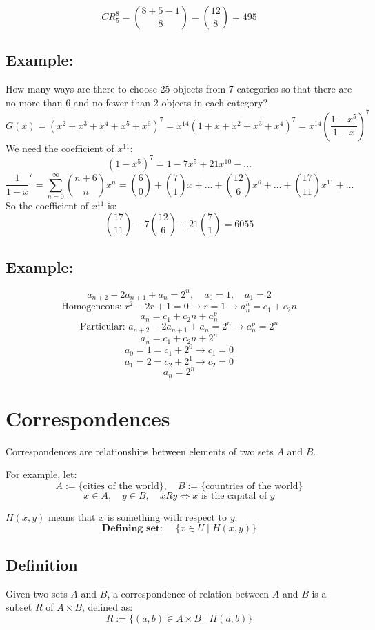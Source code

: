 \documentclass[11pt]{article}
\begin{document}
\[
CR_5^8 = \binom{8 + 5 - 1}{8} = \binom{12}{8} = 495
\]

\subsection*{Example:}
How many ways are there to choose 25 objects from 7 categories so that there are no more than 6 and no fewer than 2 objects in each category?
\[
G(x) = (x^2 + x^3 + x^4 + x^5 + x^6)^7 = x^{14} (1 + x + x^2 + x^3 + x^4)^7 = x^{14} \left( \frac{1 - x^5}{1 - x} \right)^7
\]
We need the coefficient of $x^{11}$:
\[
(1 - x^5)^7 = 1 - 7x^5 + 21x^{10} - \dots
\]
\[
\frac{1}{1 - x}^7 = \sum_{n = 0}^{\infty} \binom{n + 6}{n} x^n = \binom{6}{0} + \binom{7}{1}x + \dots + \binom{12}{6}x^6 + \dots + \binom{17}{11}x^{11} + \dots
\]
So the coefficient of $x^{11}$ is:
\[
\binom{17}{11} - 7 \binom{12}{6} + 21 \binom{7}{1} = 6055
\]

\subsection*{Example:}
\[
a_{n + 2} - 2a_{n + 1} + a_n = 2^n, \quad a_0 = 1, \quad a_1 = 2
\]
\[
\text{Homogeneous: } r^2 - 2r + 1 = 0 \rightarrow r = 1 \rightarrow a_n^h = c_1 + c_2 n
\]
\[
a_n = c_1 + c_2 n + a_n^p
\]
\[
\text{Particular: } a_{n + 2} - 2a_{n + 1} + a_n = 2^n \rightarrow a_n^p = 2^n
\]
\[
a_n = c_1 + c_2 n + 2^n
\]
\[
a_0 = 1 = c_1 + 2^0 \rightarrow c_1 = 0
\]
\[
a_1 = 2 = c_2 + 2^1 \rightarrow c_2 = 0
\]
\[
a_n = 2^n
\]

\section{Correspondences}
Correspondences are relationships between elements of two sets $A$ and $B$.

For example, let:
\[
A := \{\text{cities of the world}\}, \quad B := \{\text{countries of the world}\}
\]
\[
x \in A, \quad y \in B, \quad xRy \Longleftrightarrow x \text{ is the capital of } y
\]

$H(x,y)$ means that $x$ is something with respect to $y$.
\[
\textbf{Defining set: } \quad \{x \in U \mid H(x,y)\}
\]

\subsection{Definition}
Given two sets $A$ and $B$, a correspondence of relation between $A$ and $B$ is a subset $R$ of $A \times B$, defined as:
\[
R := \{(a,b) \in A \times B \mid H(a,b)\}
\]
\end{document}
